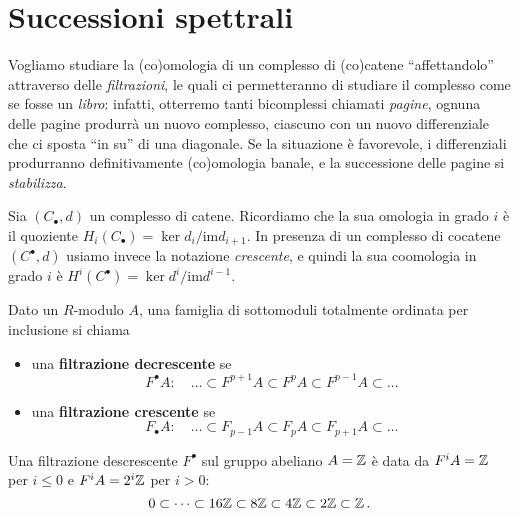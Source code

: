 \section{Successioni spettrali}

Vogliamo studiare la (co)omologia di un complesso di (co)catene 
``affettandolo'' attraverso delle \emph{filtrazioni},
le quali ci permetteranno di studiare il complesso come se fosse un \emph{libro}:
infatti, otterremo tanti bicomplessi chiamati \emph{pagine},
ognuna delle pagine produrrà un nuovo complesso,
ciascuno con un nuovo differenziale che ci sposta ``in su'' di una diagonale.
Se la situazione è favorevole, i differenziali produrranno definitivamente
(co)omologia banale, e la successione delle pagine si \emph{stabilizza}.


Sia $(C_{\bullet}, d)$ un complesso di catene.
Ricordiamo che la sua omologia in grado $i$ è il quoziente 
$H_{i}(C_{\bullet}) = \ker d_{i}/\mathrm{im} d_{i+1}$.
In presenza di un complesso di cocatene $(C^{\bullet},d)$
usiamo invece la notazione \emph{crescente},
e quindi la sua coomologia in grado $i$ è 
$H^{i}(C^{\bullet}) = \ker d^{i}/\mathrm{im} d^{i-1}$.

\begin{df}
	Dato un $R$-modulo $A$, una famiglia di sottomoduli 
	totalmente ordinata per inclusione si chiama
	\begin{itemize}
		\item una \textbf{filtrazione decrescente} se 
			\begin{equation*}
				F^{\bullet}A : \quad
				\dots \subset F^{p+1}A \subset F^{p}A \subset F^{p-1}A \subset \dots
			\end{equation*}
			
		\item una \textbf{filtrazione crescente} se 
			\begin{equation*}
				F_{\bullet}A : \quad
				\dots \subset F_{p-1}A \subset F_{p}A \subset F_{p+1}A \subset \dots
			\end{equation*}
	\end{itemize}
\end{df}


\begin{ex}
	Una filtrazione descrescente $F^{\bullet}$ sul gruppo abeliano $A = {\mathbb Z}$ è data da
	$F^{i}A = {\mathbb Z}$ per $i \le 0$ e $F^{i}A = 2^{i}{\mathbb Z}$ per $i > 0$:
	\begin{equation*}
		0 \subset \dots \subset 16{\mathbb Z} \subset 8{\mathbb Z} \subset 4{\mathbb Z} \subset 2{\mathbb Z} \subset {\mathbb Z}\,.
	\end{equation*}
\end{ex}


